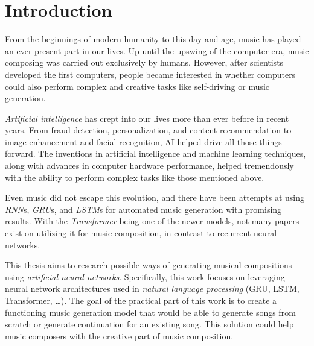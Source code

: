 \chapter*{Introduction}\label{ch:introduction}
\setcounter{page}{1}

From the beginnings of modern humanity to this day and age, music has played an ever-present part in our lives.
Up until the upswing of the computer era, music composing was carried out exclusively by humans.
However, after scientists developed the first computers, people became interested in whether computers could also perform complex and creative tasks like self-driving or music generation.

\textit{Artificial intelligence} has crept into our lives more than ever before in recent years.
From fraud detection, personalization, and content recommendation to image enhancement and facial recognition, AI helped drive all those things forward.
The inventions in artificial intelligence and machine learning techniques, along with advances in computer hardware performance, helped tremendously with the ability to perform complex tasks like those mentioned above.

Even music did not escape this evolution, and there have been attempts at using \textit{RNN}s, \textit{GRU}s, and \textit{LSTM}s for automated music generation with promising results.
With the \textit{Transformer} being one of the newer models, not many papers exist on utilizing it for music composition, in contrast to recurrent neural networks.

This thesis aims to research possible ways of generating musical compositions using \textit{artificial neural networks}.
Specifically, this work focuses on leveraging neural network architectures used in \textit{natural language processing} (GRU, LSTM, Transformer, \ldots).
The goal of the practical part of this work is to create a functioning music generation model that would be able to generate songs from scratch or generate continuation for an existing song.
This solution could help music composers with the creative part of music composition.

